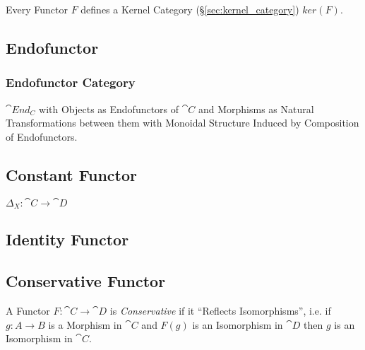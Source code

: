 Every Functor $F$ defines a Kernel Category
(\S\ref{sec:kernel_category}) $ker(F)$.



\subsection{Endofunctor}\label{sec:endofunctor}

\subsubsection{Endofunctor Category}\label{sec:endofunctor_category}

$\cat{End_C}$ with Objects as Endofunctors of $\cat{C}$ and
Morphisms as Natural Transformations between them with Monoidal
Structure Induced by Composition of Endofunctors.



\subsection{Constant Functor}\label{sec:constant_functor}

$\Delta_X : \cat{C} \rightarrow \cat{D}$



\subsection{Identity Functor}\label{sec:identity_functor}

\subsection{Conservative Functor}\label{sec:conservative_functor}

A Functor $F : \cat{C} \rightarrow \cat{D}$ is
\emph{Conservative} if it ``Reflects Isomorphisms'', i.e. if $g : A
\rightarrow B$ is a Morphism in $\cat{C}$ and $F(g)$ is an
Isomorphism in $\cat{D}$ then $g$ is an Isomorphism in
$\cat{C}$.



